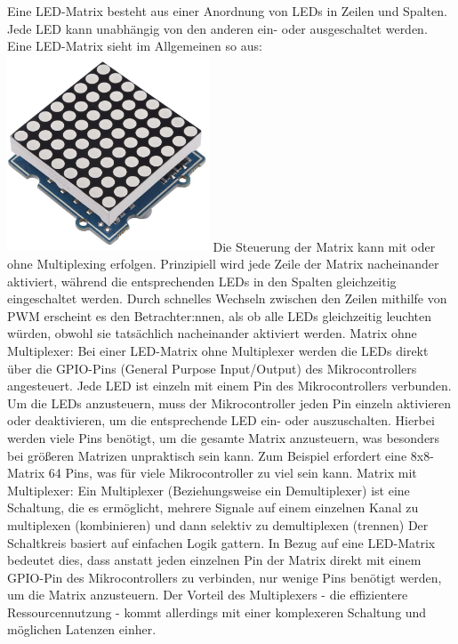 \begin{enumerate}
Eine LED-Matrix besteht aus einer Anordnung von LEDs in Zeilen und Spalten.
Jede LED kann unabhängig von den anderen ein- oder ausgeschaltet werden.\newline
Eine LED-Matrix sieht im Allgemeinen so aus:\newline
\includegraphics[width=0.45\textwidth]{img/LED-Matrix}
Die Steuerung der Matrix kann mit oder ohne Multiplexing erfolgen.
Prinzipiell wird jede Zeile der Matrix nacheinander aktiviert, während die
entsprechenden LEDs in den Spalten gleichzeitig eingeschaltet werden.
Durch schnelles Wechseln zwischen den Zeilen mithilfe von \ac{PWM} erscheint es den Betrachter:nnen, als ob alle LEDs
gleichzeitig leuchten würden, obwohl sie tatsächlich nacheinander aktiviert werden.\newline
Matrix ohne Multiplexer:\newline
Bei einer LED-Matrix ohne Multiplexer werden die LEDs direkt über die GPIO-Pins (General Purpose Input/Output) des
Mikrocontrollers angesteuert. Jede LED ist einzeln mit einem Pin des Mikrocontrollers verbunden. Um die LEDs anzusteuern,
muss der Mikrocontroller jeden Pin einzeln aktivieren oder deaktivieren, um die entsprechende LED ein- oder auszuschalten.
Hierbei werden viele Pins benötigt, um die gesamte Matrix anzusteuern, was besonders bei größeren Matrizen unpraktisch
sein kann. Zum Beispiel erfordert eine 8x8-Matrix 64 Pins, was für viele Mikrocontroller zu viel sein kann. \newline
Matrix mit Multiplexer: \newline
Ein Multiplexer (Beziehungsweise ein Demultiplexer) ist eine Schaltung, die es ermöglicht, mehrere Signale auf einem
einzelnen Kanal zu multiplexen (kombinieren) und dann selektiv zu demultiplexen (trennen)
Der Schaltkreis basiert auf einfachen Logik gattern.
In Bezug auf eine LED-Matrix bedeutet dies,
dass anstatt jeden einzelnen Pin der Matrix direkt mit einem GPIO-Pin des Mikrocontrollers zu verbinden, nur wenige Pins
benötigt werden, um die Matrix anzusteuern.
Der Vorteil des Multiplexers - die effizientere Ressourcennutzung - kommt allerdings mit einer komplexeren Schaltung und
möglichen Latenzen einher.


\end{enumerate}
